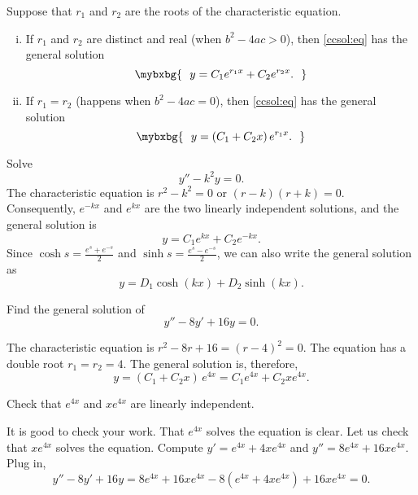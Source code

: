 \begin{theorem}
Suppose that $r_1$ and $r_2$ are the roots of the characteristic equation.
\begin{enumerate}[(i)]
\item If $r_1$ and $r_2$ are distinct and real (when $b^2 - 4ac > 0$),
then \eqref{ccsol:eq} has the general solution
\begin{equation*}
\mybxbg{~~
y = C_1 e^{r_1 x} + C_2 e^{r_2 x} .
~~}
\end{equation*}
\item If $r_1 = r_2$ (happens when $b^2 - 4ac = 0$), 
then \eqref{ccsol:eq} has the general solution
\begin{equation*}
\mybxbg{~~
y = (C_1 + C_2 x)\, e^{r_1 x} .
~~}
\end{equation*}
\end{enumerate}
\end{theorem}

\begin{example} \label{example:expsecondorder}
Solve
\begin{equation*}
y'' - k^2 y = 0 .
\end{equation*}
The characteristic equation is $r^2 - k^2 = 0$ or 
$(r-k)(r+k) = 0$.  Consequently, $e^{-k x}$ and $e^{kx}$ are the two
linearly independent solutions, and the general solution is
\begin{equation*}
y = C_1 e^{kx} + C_2e^{-kx} .
\end{equation*}
Since
$\cosh s = \frac{e^s+e^{-s}}{2}$
and
$\sinh s = \frac{e^s-e^{-s}}{2}$,
we can also write the general solution
as
\begin{equation*}
y = D_1 \cosh(kx) + D_2 \sinh(kx) .
\end{equation*}
\end{example}

\begin{example}
Find the general solution of
\begin{equation*}
y'' -8 y' + 16 y = 0 .
\end{equation*}

The characteristic equation is $r^2 - 8 r + 16 = {(r-4)}^2 = 0$.
The equation has a 
double root $r_1 = r_2 = 4$.  The general solution is, therefore,
\begin{equation*}
y = (C_1 + C_2 x)\, e^{4 x} = C_1 e^{4x} + C_2 x e^{4x} .
\end{equation*}

\begin{exercise}
Check that $e^{4x}$ and $x e^{4x}$ are linearly independent.
\end{exercise}

It is good to check your work.
That $e^{4x}$ solves the equation is clear.
Let us check that
$x e^{4x}$ solves the equation.
Compute
$y' = e^{4x} + 4xe^{4x}$ and
$y'' = 8 e^{4x} + 16xe^{4x}$.  Plug in,
\begin{equation*}
y'' - 8 y' + 16 y = 
8 e^{4x} + 16xe^{4x} - 8(e^{4x} + 4xe^{4x}) + 16 xe^{4x} = 
0 .
\end{equation*}
\end{example}

